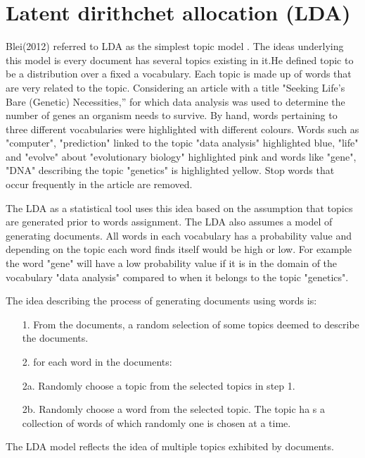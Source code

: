 \section{ Latent dirithchet allocation (LDA)}
\begin{flushleft}
Blei(2012) referred to LDA as the simplest topic model . The ideas underlying this model is every document has several topics existing in it.He defined topic to be a distribution over a fixed a vocabulary.
Each topic is made up of words that are very related to the topic. Considering an article with a title "Seeking Life’s Bare (Genetic) Necessities,” for which data analysis was used to determine the number of genes an organism needs to survive. By hand, words pertaining to three different vocabularies were highlighted with different colours. Words such as "computer", "prediction" linked to the topic "data analysis" highlighted blue, "life" and "evolve" about "evolutionary biology" highlighted pink and words like "gene", "DNA" describing the topic "genetics" is highlighted yellow.
Stop words that occur frequently in the article are removed. 
\end{flushleft}

The LDA as a statistical tool uses this idea based on the assumption that topics are generated prior to words assignment. The LDA also assumes a model of generating documents. All words in each vocabulary has a probability value and depending on the topic each word finds itself would be high or low. For example the word "gene" will have a low probability value if it is in the domain of the  vocabulary "data analysis" compared to when it belongs to the topic "genetics". 

The idea describing the process of generating documents using words is:
\begin{itemize}
\item[1.] From the documents, a random selection of some topics deemed to describe the documents.
\item[2.] for each word in the documents:
		\item[2a.]Randomly choose a topic from
the selected topics in step 1.
		\item[2b.]Randomly choose a word from the selected topic. The topic ha s a collection of words of which randomly one is chosen at a time. 
\end{itemize}
The LDA model reflects the idea of multiple topics exhibited by documents.

